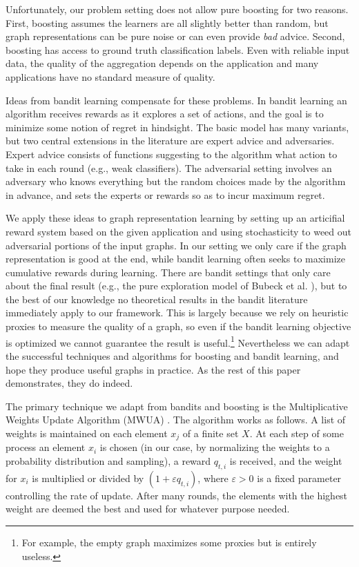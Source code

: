\documentclass{article}
\begin{document}
Unfortunately, our problem setting does not allow pure boosting for two
reasons. First, boosting assumes the learners are all slightly better than
random, but graph representations can be pure noise or can even provide
\emph{bad} advice. Second, boosting has access to ground truth classification
labels. Even with reliable input data, the quality of the aggregation depends
on the application and many applications have no standard measure of quality. 

Ideas from bandit learning compensate for these problems. In bandit learning an
algorithm receives rewards as it explores a set of actions, and the goal is to
minimize some notion of regret in hindsight. The basic model has many variants,
but two central extensions in the literature are expert advice and adversaries.
Expert advice consists of functions suggesting to the algorithm what action to
take in each round (e.g., weak classifiers). The adversarial setting involves
an adversary who knows everything but the random choices made by the algorithm
in advance, and sets the experts or rewards so as to incur maximum regret. 

We apply these ideas to graph representation learning by setting up an
articifial reward system based on the given application and using stochasticity
to weed out adversarial portions of the input graphs. In our setting we only
care if the graph representation is good at the end, while bandit learning
often seeks to maximize cumulative rewards during learning. There are bandit
settings that only care about the final result (e.g., the pure exploration
model of Bubeck et al. \cite{Bubeck09}), but to the best of our knowledge no
theoretical results in the bandit literature immediately apply to our
framework. This is largely because we rely on heuristic proxies to measure the
quality of a graph, so even if the bandit learning objective is optimized we
cannot guarantee the result is useful.\footnote{For example, the empty graph
maximizes some proxies but is entirely useless.} Nevertheless we can adapt the
successful techniques and algorithms for boosting and bandit learning, and hope
they produce useful graphs in practice. As the rest of this paper demonstrates,
they do indeed.

The primary technique we adapt from bandits and boosting is the Multiplicative
Weights Update Algorithm (MWUA) \cite{Arora12}. The algorithm works as follows.
A list of weights is maintained on each element $x_j$ of a finite set $X$. At
each step of some process an element $x_i$ is chosen (in our case, by
normalizing the weights to a probability distribution and sampling), a reward
$q_{t,i}$ is received, and the weight for $x_i$ is multiplied or divided by $(1
+ \varepsilon q_{t,i})$, where $\varepsilon >0$ is a fixed parameter
controlling the rate of update. After many rounds, the elements with the
highest weight are deemed the best and used for whatever purpose needed. 
\end{document}
